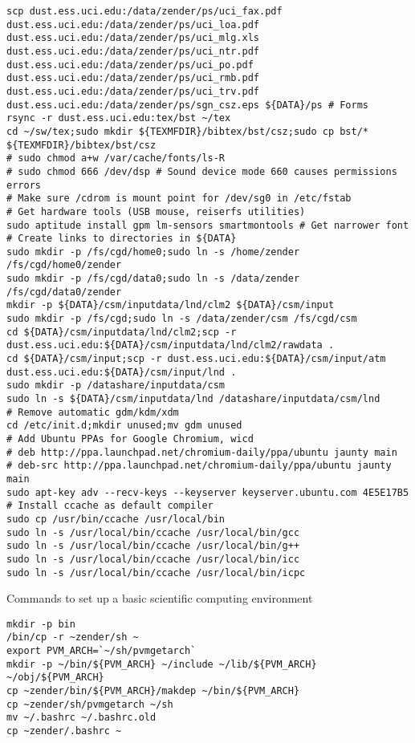 \documentclass[12pt,twoside]{article}
\begin{document}
\begin{verbatim}
scp dust.ess.uci.edu:/data/zender/ps/uci_fax.pdf dust.ess.uci.edu:/data/zender/ps/uci_loa.pdf dust.ess.uci.edu:/data/zender/ps/uci_mlg.xls dust.ess.uci.edu:/data/zender/ps/uci_ntr.pdf dust.ess.uci.edu:/data/zender/ps/uci_po.pdf dust.ess.uci.edu:/data/zender/ps/uci_rmb.pdf dust.ess.uci.edu:/data/zender/ps/uci_trv.pdf dust.ess.uci.edu:/data/zender/ps/sgn_csz.eps ${DATA}/ps # Forms
rsync -r dust.ess.uci.edu:tex/bst ~/tex
cd ~/sw/tex;sudo mkdir ${TEXMFDIR}/bibtex/bst/csz;sudo cp bst/* ${TEXMFDIR}/bibtex/bst/csz
# sudo chmod a+w /var/cache/fonts/ls-R
# sudo chmod 666 /dev/dsp # Sound device mode 660 causes permissions errors
# Make sure /cdrom is mount point for /dev/sg0 in /etc/fstab
# Get hardware tools (USB mouse, reiserfs utilities)
sudo aptitude install gpm lm-sensors smartmontools # Get narrower font
# Create links to directories in ${DATA}
sudo mkdir -p /fs/cgd/home0;sudo ln -s /home/zender /fs/cgd/home0/zender
sudo mkdir -p /fs/cgd/data0;sudo ln -s /data/zender /fs/cgd/data0/zender
mkdir -p ${DATA}/csm/inputdata/lnd/clm2 ${DATA}/csm/input
sudo mkdir -p /fs/cgd;sudo ln -s /data/zender/csm /fs/cgd/csm
cd ${DATA}/csm/inputdata/lnd/clm2;scp -r dust.ess.uci.edu:${DATA}/csm/inputdata/lnd/clm2/rawdata .
cd ${DATA}/csm/input;scp -r dust.ess.uci.edu:${DATA}/csm/input/atm dust.ess.uci.edu:${DATA}/csm/input/lnd .
sudo mkdir -p /datashare/inputdata/csm
sudo ln -s ${DATA}/csm/inputdata/lnd /datashare/inputdata/csm/lnd
# Remove automatic gdm/kdm/xdm
cd /etc/init.d;mkdir unused;mv gdm unused
# Add Ubuntu PPAs for Google Chromium, wicd
# deb http://ppa.launchpad.net/chromium-daily/ppa/ubuntu jaunty main 
# deb-src http://ppa.launchpad.net/chromium-daily/ppa/ubuntu jaunty main 
sudo apt-key adv --recv-keys --keyserver keyserver.ubuntu.com 4E5E17B5
# Install ccache as default compiler
sudo cp /usr/bin/ccache /usr/local/bin
sudo ln -s /usr/local/bin/ccache /usr/local/bin/gcc
sudo ln -s /usr/local/bin/ccache /usr/local/bin/g++
sudo ln -s /usr/local/bin/ccache /usr/local/bin/icc
sudo ln -s /usr/local/bin/ccache /usr/local/bin/icpc
\end{verbatim}

Commands to set up a basic scientific computing environment
\begin{verbatim}
mkdir -p bin
/bin/cp -r ~zender/sh ~
export PVM_ARCH=`~/sh/pvmgetarch`
mkdir -p ~/bin/${PVM_ARCH} ~/include ~/lib/${PVM_ARCH} ~/obj/${PVM_ARCH}
cp ~zender/bin/${PVM_ARCH}/makdep ~/bin/${PVM_ARCH}
cp ~zender/sh/pvmgetarch ~/sh
mv ~/.bashrc ~/.bashrc.old
cp ~zender/.bashrc ~
\end{verbatim}
\end{document}
